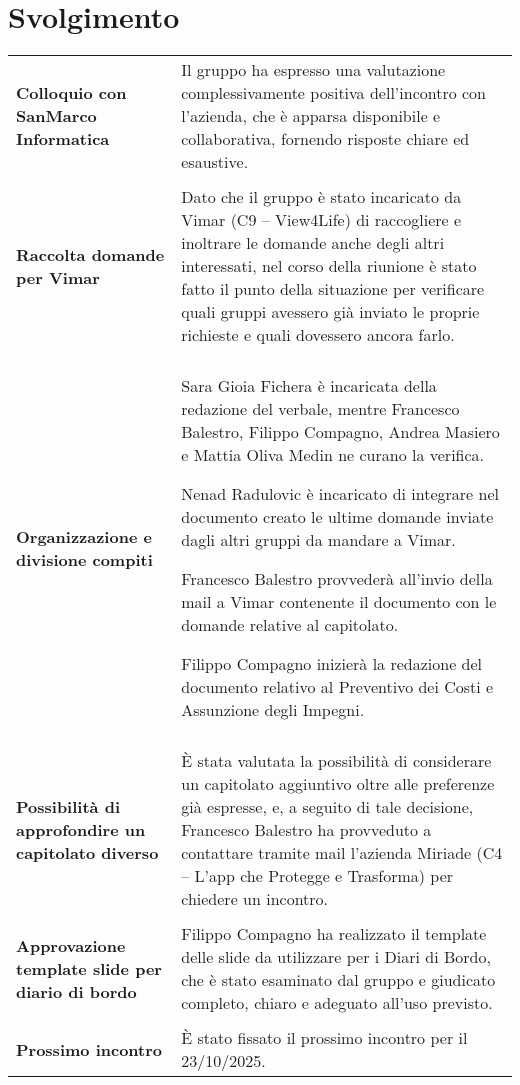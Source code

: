 \documentclass[a4paper,12pt]{article}
\begin{document}
\section{Svolgimento}
\begin{longtable}{P{5cm}|P{10cm}}
\textbf{Colloquio con SanMarco Informatica} & Il gruppo ha espresso una valutazione complessivamente positiva dell’incontro con l’azienda, che è apparsa disponibile e collaborativa, fornendo risposte chiare ed esaustive. \\
\\

\textbf{Raccolta domande per Vimar} & Dato che il gruppo è stato incaricato da Vimar (C9 – View4Life) di raccogliere e inoltrare le domande anche degli altri interessati, nel corso della riunione è stato fatto il punto della situazione per verificare quali gruppi avessero già inviato le proprie richieste e quali dovessero ancora farlo. \\
\\
\textbf{Organizzazione e divisione compiti} & Sara Gioia Fichera è incaricata della redazione del verbale, mentre Francesco Balestro, Filippo Compagno, Andrea Masiero e Mattia Oliva Medin ne curano la verifica.

Nenad Radulovic è incaricato di integrare nel documento creato le ultime domande inviate dagli altri gruppi da mandare a Vimar.

Francesco Balestro provvederà all’invio della mail a Vimar contenente il documento con le domande relative al capitolato.

Filippo Compagno inizierà la redazione del documento relativo al Preventivo dei Costi e Assunzione degli Impegni.
\\
\\

\textbf{Possibilità di approfondire un capitolato diverso} & È stata valutata la possibilità di considerare un capitolato aggiuntivo oltre alle preferenze già espresse, e, a seguito di tale decisione, Francesco Balestro ha provveduto a contattare tramite mail l’azienda Miriade (C4 – L’app che Protegge e Trasforma) per chiedere un incontro.\\
\\

\textbf{Approvazione template slide per diario di bordo} & Filippo Compagno ha realizzato il template delle slide da utilizzare per i Diari di Bordo, che è stato esaminato dal gruppo e giudicato completo, chiaro e adeguato all’uso previsto.\\
\\

\textbf{Prossimo incontro} & È stato fissato il prossimo incontro per il 23/10/2025.  \\
\end{longtable}
\end{document}
